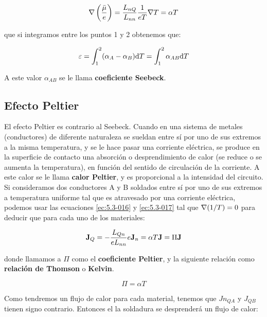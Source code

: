 \documentclass[12pt,a4paper,oneside]{book}
\begin{document}
\begin{equation}
\nabla \left( \frac{\bar{\mu}}{e} \right) = \dfrac{L_{nQ}}{L_{nn}}
 \dfrac{1}{e T} \nabla T = \alpha T
 \end{equation}
 
que si integramos entre los puntos 1 y 2 obtenemos que:

\begin{equation}
\varepsilon = \int_1^2 (\alpha_A - \alpha_B) \mathrm{d} T = \int_1^2 \alpha_{AB} \mathrm{d} T
\end{equation}

A este valor $\alpha_{AB}$ se le llama \textbf{coeficiente Seebeck}. 

\subsection{Efecto Peltier}

El efecto Peltier es contrario al Seebeck. Cuando en una sistema de metales (conductores) de diferente naturaleza se sueldan entre sí por uno de sus extremos a la misma temperatura, y se le hace pasar una corriente eléctrica, se produce en la superficie de contacto una absorción o desprendimiento de calor (se reduce o se aumenta la temperatura), en función del sentido de circulación de la corriente. A este calor se le llama \textbf{calor Peltier}, y es proporcional a la intensidad del circuito.\\


Si consideramos dos conductores A y B soldados entre sí por uno de sus extremos a temperatura uniforme tal que es atravesado por una corriente eléctrica, podemos usar las ecuaciones \ref{ec:5.3-016} y \ref{ec:5.3-017} tal que $\nabla (1/T) = 0$ para deducir que para cada uno de los materiales:

\begin{equation}
\textbf{J}_Q = - \dfrac{L_{Qn}}{e L_{nn}} e \textbf{J}_n = \alpha T \textbf{J} = \Pi \textbf{J}
\end{equation} 
 
donde llamamos a $\Pi$ como el \textbf{coeficiente Peltier}, y la siguiente relación como \textbf{relación de Thomson} o \textbf{Kelvin}. 

\begin{equation}
\Pi = \alpha T \label{Ec:5.3-023}
\end{equation}

Como tendremos un flujo de calor para cada material, tenemos que $Jn_{QA}$ y $J_{QB}$  tienen signo contrario. Entonces el la soldadura se desprenderá un flujo de calor:
\end{document}

